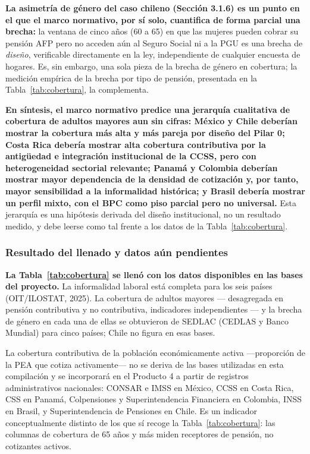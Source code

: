 \documentclass[12pt, letterpaper]{article}
\begin{document}
\textbf{La asimetría de género del caso chileno (Sección 3.1.6) es un punto en el que el marco normativo, por sí solo, cuantifica de forma parcial una brecha:} la ventana de cinco años (60 a 65) en que las mujeres pueden cobrar su pensión AFP pero no acceden aún al Seguro Social ni a la PGU es una brecha de \textit{diseño}, verificable directamente en la ley, independiente de cualquier encuesta de hogares. Es, sin embargo, una sola pieza de la brecha de género en cobertura; la medición empírica de la brecha por tipo de pensión, presentada en la Tabla~\ref{tab:cobertura}, la complementa.

\textbf{En síntesis, el marco normativo predice una jerarquía cualitativa de cobertura de adultos mayores aun sin cifras: México y Chile deberían mostrar la cobertura más alta y más pareja por diseño del Pilar 0; Costa Rica debería mostrar alta cobertura contributiva por la antigüedad e integración institucional de la CCSS, pero con heterogeneidad sectorial relevante; Panamá y Colombia deberían mostrar mayor dependencia de la densidad de cotización y, por tanto, mayor sensibilidad a la informalidad histórica; y Brasil debería mostrar un perfil mixto, con el BPC como piso parcial pero no universal.} Esta jerarquía es una hipótesis derivada del diseño institucional, no un resultado medido, y debe leerse como tal frente a los datos de la Tabla~\ref{tab:cobertura}.

\subsubsection{Resultado del llenado y datos aún pendientes}

\textbf{La Tabla~\ref{tab:cobertura} se llenó con los datos disponibles en las bases del proyecto.} La informalidad laboral está completa para los seis países (OIT/ILOSTAT, 2025). La cobertura de adultos mayores --- desagregada en pensión contributiva y no contributiva, indicadores independientes --- y la brecha de género en cada una de ellas se obtuvieron de SEDLAC (CEDLAS y Banco Mundial) para cinco países; Chile no figura en esas bases.

La cobertura contributiva de la población económicamente activa ---proporción de
la PEA que cotiza activamente--- no se deriva de las bases utilizadas en esta
compilación y se incorporará en el Producto 4 a partir de registros
administrativos nacionales: CONSAR e IMSS en México, CCSS en Costa Rica, CSS en
Panamá, Colpensiones y Superintendencia Financiera en Colombia, INSS en Brasil, y
Superintendencia de Pensiones en Chile. Es un indicador conceptualmente distinto
de los que sí recoge la Tabla~\ref{tab:cobertura}: las columnas de cobertura de
65 años y más miden receptores de pensión, no cotizantes activos.
\end{document}
